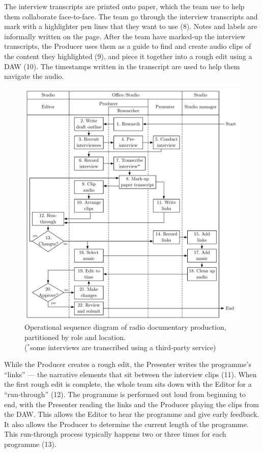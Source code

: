 The interview transcripts are printed onto paper, which the team use to help them collaborate face-to-face.  The team
go through the interview transcripts and mark with a highlighter pen lines that they want to use (8). Notes and labels
are informally written on the page.  After the team have marked-up the interview transcripts, the Producer uses them as
a guide to find and create audio clips of the content they highlighted (9), and piece it together into a rough edit
using a DAW (10). The timestamps written in the transcript are used to help them navigate the audio.

\begin{figure}[p]
  \centering
  \includegraphics[width=\columnwidth]{figs/docs-workflow.pdf}
  \caption[Operational sequence diagram of radio documentary production, partitioned by role and location.]{Operational
  sequence diagram of radio documentary production, partitioned by role and location.\\ {\footnotesize ($^{*}$some
  interviews are transcribed using a third-party service)}}
  \label{fig:ethno-docs-workflow}
\end{figure}

While the Producer creates a rough edit, the Presenter writes the programme's ``links'' --- the narrative elements that
sit between the interview clips (11). When the first rough edit is complete, the whole team sits down with the Editor
for a ``run-through'' (12). The programme is performed out loud from beginning to end, with the Presenter reading the
links and the Producer playing the clips from the DAW. This allows the Editor to hear the programme and give early
feedback. It also allows the Producer to determine the current length of the programme.  This run-through process
typically happens two or three times for each programme (13).

